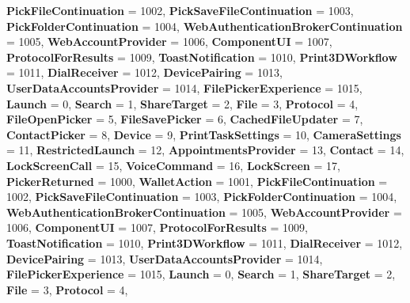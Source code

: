 \begin{DoxyCompactItemize}
\newline
{\bfseries Pick\+File\+Continuation} = 1002, 
{\bfseries Pick\+Save\+File\+Continuation} = 1003, 
{\bfseries Pick\+Folder\+Continuation} = 1004, 
{\bfseries Web\+Authentication\+Broker\+Continuation} = 1005, 
\newline
{\bfseries Web\+Account\+Provider} = 1006, 
{\bfseries Component\+UI} = 1007, 
{\bfseries Protocol\+For\+Results} = 1009, 
{\bfseries Toast\+Notification} = 1010, 
\newline
{\bfseries Print3\+D\+Workflow} = 1011, 
{\bfseries Dial\+Receiver} = 1012, 
{\bfseries Device\+Pairing} = 1013, 
{\bfseries User\+Data\+Accounts\+Provider} = 1014, 
\newline
{\bfseries File\+Picker\+Experience} = 1015, 
{\bfseries Launch} = 0, 
{\bfseries Search} = 1, 
{\bfseries Share\+Target} = 2, 
\newline
{\bfseries File} = 3, 
{\bfseries Protocol} = 4, 
{\bfseries File\+Open\+Picker} = 5, 
{\bfseries File\+Save\+Picker} = 6, 
\newline
{\bfseries Cached\+File\+Updater} = 7, 
{\bfseries Contact\+Picker} = 8, 
{\bfseries Device} = 9, 
{\bfseries Print\+Task\+Settings} = 10, 
\newline
{\bfseries Camera\+Settings} = 11, 
{\bfseries Restricted\+Launch} = 12, 
{\bfseries Appointments\+Provider} = 13, 
{\bfseries Contact} = 14, 
\newline
{\bfseries Lock\+Screen\+Call} = 15, 
{\bfseries Voice\+Command} = 16, 
{\bfseries Lock\+Screen} = 17, 
{\bfseries Picker\+Returned} = 1000, 
\newline
{\bfseries Wallet\+Action} = 1001, 
{\bfseries Pick\+File\+Continuation} = 1002, 
{\bfseries Pick\+Save\+File\+Continuation} = 1003, 
{\bfseries Pick\+Folder\+Continuation} = 1004, 
\newline
{\bfseries Web\+Authentication\+Broker\+Continuation} = 1005, 
{\bfseries Web\+Account\+Provider} = 1006, 
{\bfseries Component\+UI} = 1007, 
{\bfseries Protocol\+For\+Results} = 1009, 
\newline
{\bfseries Toast\+Notification} = 1010, 
{\bfseries Print3\+D\+Workflow} = 1011, 
{\bfseries Dial\+Receiver} = 1012, 
{\bfseries Device\+Pairing} = 1013, 
\newline
{\bfseries User\+Data\+Accounts\+Provider} = 1014, 
{\bfseries File\+Picker\+Experience} = 1015, 
{\bfseries Launch} = 0, 
{\bfseries Search} = 1, 
\newline
{\bfseries Share\+Target} = 2, 
{\bfseries File} = 3, 
{\bfseries Protocol} = 4, 

\end{DoxyCompactItemize}
